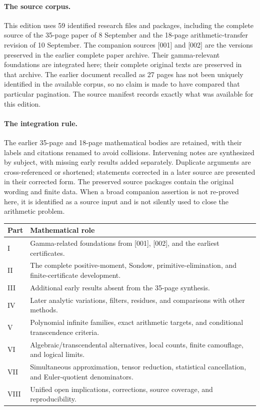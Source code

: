 \documentclass[11pt,a4paper]{article}
\theoremstyle{definition}
\theoremstyle{remark}
\numberwithin{equation}{section}
\begin{document}
\paragraph{The source corpus.}
This edition uses 59 identified research files and packages, including the
complete source of the 35-page paper of 8 September and the 18-page
arithmetic-transfer revision of 10 September. The companion sources [001]
and [002] are the versions preserved in the earlier complete paper archive.
Their gamma-relevant foundations are integrated here; their complete
original texts are preserved in that archive. The earlier document recalled
as 27 pages has not been uniquely identified in the available corpus, so no
claim is made to have compared that particular pagination. The source
manifest records exactly what was available for this edition.

\paragraph{The integration rule.}
The earlier 35-page and 18-page mathematical bodies are retained, with
their labels and citations renamed to avoid collisions. Intervening notes
are synthesized by subject, with missing early results added separately.
Duplicate arguments are cross-referenced or shortened; statements corrected
in a later source are presented in their corrected form. The preserved
source packages contain the original wording and finite data. When a broad
companion assertion is not re-proved here, it is identified as a source
input and is not silently used to close the arithmetic problem.

\begin{center}\small
\begin{tabularx}{\linewidth}{@{}p{.14\linewidth}X@{}}
\toprule
Part & Mathematical role \\
\midrule
I & Gamma-related foundations from [001], [002], and the earliest certificates.\\
II & The complete positive-moment, Sondow, primitive-elimination, and finite-certificate development.\\
III & Additional early results absent from the 35-page synthesis.\\
IV & Later analytic variations, filters, residues, and comparisons with other methods.\\
V & Polynomial infinite families, exact arithmetic targets, and conditional transcendence criteria.\\
VI & Algebraic/transcendental alternatives, local counts, finite camouflage, and logical limits.\\
VII & Simultaneous approximation, tensor reduction, statistical cancellation, and Euler-quotient denominators.\\
VIII & Unified open implications, corrections, source coverage, and reproducibility.\\
\bottomrule
\end{tabularx}
\end{center}
\end{document}
